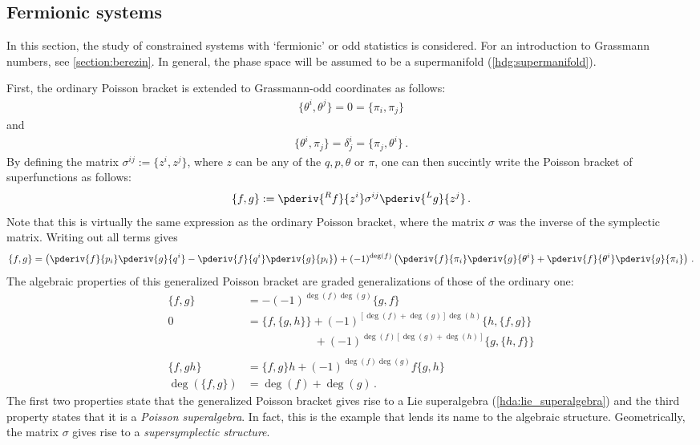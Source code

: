 \subsection{Fermionic systems}

    In this section, the study of constrained systems with `fermionic' or odd statistics is considered. For an introduction to Grassmann numbers, see \cref{section:berezin}. In general, the phase space will be assumed to be a supermanifold (\cref{hdg:supermanifold}).

    First, the ordinary Poisson bracket is extended to Grassmann-odd coordinates as follows:
    \begin{gather}
        \{\theta^i,\theta^j\} = 0 = \{\pi_i,\pi_j\}
    \end{gather}
    and
    \begin{gather}
        \{\theta^i,\pi_j\} = \delta^i_j = \{\pi_j,\theta^i\}\,.
    \end{gather}
    By defining the matrix $\sigma^{ij} := \{z^i,z^j\}$, where $z$ can be any of the $q,p,\theta$ or $\pi$, one can then succintly write the Poisson bracket of superfunctions as follows:
    \begin{gather}
        \{f,g\} := \pderiv{^Rf}{z^i}\sigma^{ij}\pderiv{^Lg}{z^j}\,.
    \end{gather}
    Note that this is virtually the same expression as the ordinary Poisson bracket, where the matrix $\sigma$ was the inverse of the symplectic matrix. Writing out all terms gives
    \begin{gather}
        \{f,g\} = \left(\pderiv{f}{p_i}\pderiv{g}{q^i}-\pderiv{f}{q^i}\pderiv{g}{p_i}\right) + (-1)^{\deg(f)}\left(\pderiv{f}{\pi_i}\pderiv{g}{\theta^i} + \pderiv{f}{\theta^i}\pderiv{g}{\pi_i}\right)\,.
    \end{gather}
    The algebraic properties of this generalized Poisson bracket are graded generalizations of those of the ordinary one:
    \begin{align}
        \{f,g\} &= -(-1)^{\deg(f)\deg(g)}\{g,f\}\\
        0 &= \{f,\{g,h\}\} + (-1)^{[\deg(f)+\deg(g)]\deg(h)}\{h,\{f,g\}\}\nonumber\\
        &\ \phantom{= \{f,\{g,h\}\} } + (-1)^{\deg(f)[\deg(g)+\deg(h)]}\{g,\{h,f\}\}\\\nonumber\\
        \{f,gh\} &= \{f,g\}h + (-1)^{\deg(f)\deg(g)}f\{g,h\}\\
        \deg(\{f,g\}) &= \deg(f)+\deg(g)\,.
    \end{align}
    The first two properties state that the generalized Poisson bracket gives rise to a Lie superalgebra (\cref{hda:lie_superalgebra}) and the third property states that it is a \textit{Poisson superalgebra}. In fact, this is the example that lends its name to the algebraic structure. Geometrically, the matrix $\sigma$ gives rise to a \textit{supersymplectic structure}.

